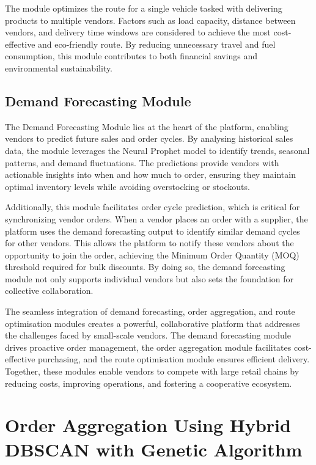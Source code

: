 The module optimizes the route for a single vehicle tasked with delivering products to multiple vendors. Factors such as load capacity, distance between vendors, and delivery time windows are considered to achieve the most cost-effective and eco-friendly route. By reducing unnecessary travel and fuel consumption, this module contributes to both financial savings and environmental sustainability.

\subsection{Demand Forecasting Module}

The Demand Forecasting Module lies at the heart of the platform, enabling vendors to predict future sales and order cycles. By analysing historical sales data, the module leverages the Neural Prophet model to identify trends, seasonal patterns, and demand fluctuations. The predictions provide vendors with actionable insights into when and how much to order, ensuring they maintain optimal inventory levels while avoiding overstocking or stockouts.

Additionally, this module facilitates order cycle prediction, which is critical for synchronizing vendor orders. When a vendor places an order with a supplier, the platform uses the demand forecasting output to identify similar demand cycles for other vendors. This allows the platform to notify these vendors about the opportunity to join the order, achieving the Minimum Order Quantity (MOQ) threshold required for bulk discounts. By doing so, the demand forecasting module not only supports individual vendors but also sets the foundation for collective collaboration.


The seamless integration of demand forecasting, order aggregation, and route optimisation modules creates a powerful, collaborative platform that addresses the challenges faced by small-scale vendors. The demand forecasting module drives proactive order management, the order aggregation module facilitates cost-effective purchasing, and the route optimisation module ensures efficient delivery. Together, these modules enable vendors to compete with large retail chains by reducing costs, improving operations, and fostering a cooperative ecosystem.





\section{Order Aggregation Using Hybrid DBSCAN with Genetic Algorithm}

